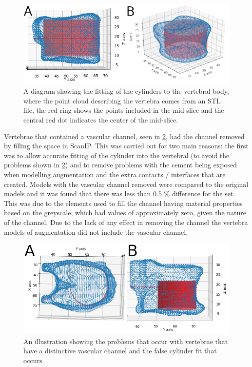 \begin{figure}[ht!]
  \centering
  \includegraphics[width=5in]{Chapters/Chapter_HT_images/cyl_fit_ful_iso_both.png}
  \caption{A diagram showing the fitting of the cylinders to the vertebral body, where the point cloud describing the vertebra comes from an STL file, the red ring shows the points included in the mid-slice and the central red dot indicates the center of the mid-slice.}
  \label{fig:cyl_fit}
\end{figure}

Vertebrae that contained a vascular channel, seen in \cref{fig:cyl_channel}, had the channel removed by filling the space in ScanIP.
This was carried out for two main reasons: the first was to allow accurate fitting of the cylinder into the vertebral (to avoid the problems shown in \cref{fig:cyl_channel}) and to remove problems with the cement being exposed when modelling augmentation and the extra contacts / interfaces that are created.
Models with the vascular channel removed were compared to the original models and it was found that there was less than 0.5 \% difference for the set.
This was due to the elements used to fill the channel having material properties based on the greyscale, which had values of approximately zero, given the nature of the channel.
Due to the lack of any effect in removing the channel the vertebra models of augmentation did not include the vascular channel.

\begin{figure}[ht!]
  \centering
  \includegraphics[width=5in]{Chapters/Chapter_HT_images/cyl_fit_channel_both.png}
  \caption{An illustration showing the problems that occur with vertebrae that have a distinctive vascular channel and the false cylinder fit that occurs.}
  \label{fig:cyl_channel}
\end{figure}

